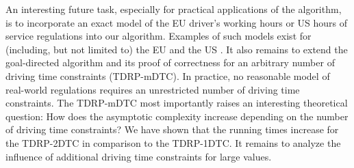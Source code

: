 An interesting future task, especially for practical applications of the algorithm, is to incorporate an exact model of the EU driver's working hours or US hours of service regulations into our algorithm. Examples of such models exist for (including, but not limited to) the EU \cite{goel:2009a} and the US \cite{goel:2012c}. It also remains to extend the goal-directed algorithm and its proof of correctness for an arbitrary number of driving time constraints (TDRP-mDTC). In practice, no reasonable model of real-world regulations requires an unrestricted number of driving time constraints. The TDRP-mDTC most importantly raises an interesting theoretical question: How does the asymptotic complexity increase depending on the number of driving time constraints? We have shown that the running times increase for the TDRP-2DTC in comparison to the TDRP-1DTC. It remains to analyze the influence of additional driving time constraints for large values.


